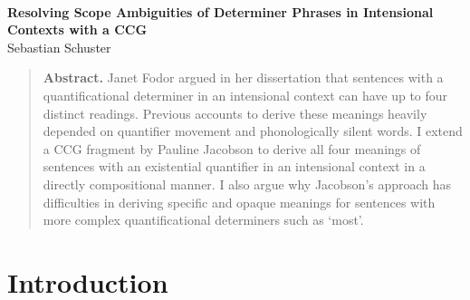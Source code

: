 \documentclass[parskip=half]{scrartcl}
\begin{document}
\thispagestyle{scrheadings}
~

\vspace{-2ex}

\begin{center}
\LARGE{ \textsf{\textbf{Resolving Scope Ambiguities of Determiner Phrases in Intensional Contexts with a CCG}}} \\ \vspace{1ex}
\vspace{1ex}
\normalsize{Sebastian Schuster}
\end{center}

\vspace{1ex}
\begin{abstract}
\textbf{Abstract.} Janet Fodor argued in her dissertation that sentences with a quantificational determiner in an intensional context can
have up to four distinct readings. Previous accounts to derive these meanings heavily depended on quantifier movement and 
phonologically silent words. I extend a CCG fragment by Pauline Jacobson to derive  all four meanings of sentences with an existential
quantifier in an intensional context in a directly compositional manner. I also argue why Jacobson's approach has difficulties in deriving specific and
opaque meanings for sentences with more complex quantificational determiners such as `most'.
\end{abstract}

\vspace{1ex}

\section{Introduction}
\end{document}
